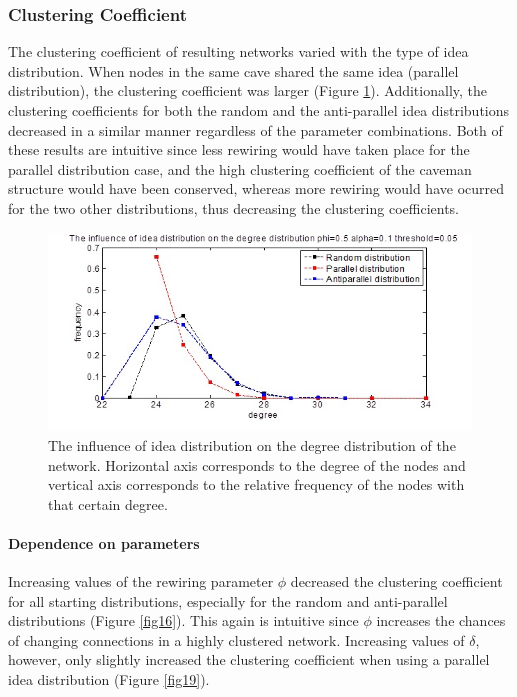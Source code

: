 \subsubsection{Clustering Coefficient}

The clustering coefficient of resulting networks varied with the type of idea distribution. When nodes in the same cave shared the same idea (parallel distribution), the clustering coefficient was larger (Figure \ref{fig10}). Additionally, the clustering coefficients for both the random and the anti-parallel idea distributions decreased in a similar manner regardless of the parameter combinations. Both of these results are intuitive since less rewiring would have taken place for the parallel distribution case, and the high clustering coefficient of the caveman structure would have been conserved, whereas more rewiring would have ocurred for the two other distributions, thus decreasing the clustering coefficients.

\begin{figure}
[htp]
\begin{center}
\includegraphics{Fig10}
\end{center}
\caption{ The influence of idea distribution on the degree distribution of the network. Horizontal axis corresponds to the degree of the nodes and vertical axis corresponds to the relative frequency of the nodes with that certain degree.   }
\label {fig10}
\end{figure}

\paragraph{Dependence on parameters}
Increasing values of the rewiring parameter $\phi$ decreased the clustering coefficient for all starting distributions, especially for the random and anti-parallel distributions (Figure \ref{fig16}). This again is intuitive since $\phi$ increases the chances of changing connections in a highly clustered network.
Increasing values of $\delta$, however, only slightly increased the clustering coefficient when using a parallel idea distribution (Figure \ref{fig19}). 

